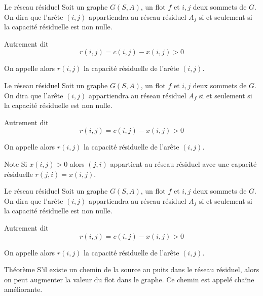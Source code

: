 \begin{frame}{Le réseau résiduel}
 	Soit un graphe $G(S, A)$, un flot $f$ et $i,j$ deux sommets de $G$. On dira que
	l'arête $(i,j)$ appartiendra au réseau résiduel $A_f$ si et seulement si la capacité résiduelle
	est non nulle.

	\begin{alertblock}{Autrement dit}
	 	$$ r(i,j) = c(i,j) - x(i,j) > 0 $$ 
	\end{alertblock}

	On appelle alors $r(i,j)$ la capacité résiduelle de l'arête $(i,j)$. 
	\vfill
\end{frame}

\begin{frame}{Le réseau résiduel}
 	Soit un graphe $G(S, A)$, un flot $f$ et $i,j$ deux sommets de $G$. On dira que
	l'arête $(i,j)$ appartiendra au réseau résiduel $A_f$ si et seulement si la capacité résiduelle
	est non nulle.

	\begin{alertblock}{Autrement dit}
	 	$$ r(i,j) = c(i,j) - x(i,j) > 0 $$ 
	\end{alertblock}


	On appelle alors $r(i,j)$ la capacité résiduelle de l'arête $(i,j)$. 

	\begin{block}{Note}
		Si $x(i,j) > 0$ alors $(j,i)$ appartient au réseau résiduel avec une capacité résiduelle $r(j,i) = x(i,j)$.
	\end{block}
\end{frame}

\begin{frame}{Le réseau résiduel}
 	Soit un graphe $G(S, A)$, un flot $f$ et $i,j$ deux sommets de $G$. On dira que
	l'arête $(i,j)$ appartiendra au réseau résiduel $A_f$ si et seulement si la capacité résiduelle
	est non nulle.

	\begin{alertblock}{Autrement dit}
	 	$$ r(i,j) = c(i,j) - x(i,j) > 0 $$ 
	\end{alertblock}


	On appelle alors $r(i,j)$ la capacité résiduelle de l'arête $(i,j)$. 

	\begin{alertblock}{Théorème}
	S'il existe un chemin de la source au puits dans le réseau résiduel, alors on peut augmenter la
	valeur du flot dans le graphe. Ce chemin est appelé chaîne améliorante.
	\end{alertblock}
\end{frame}

